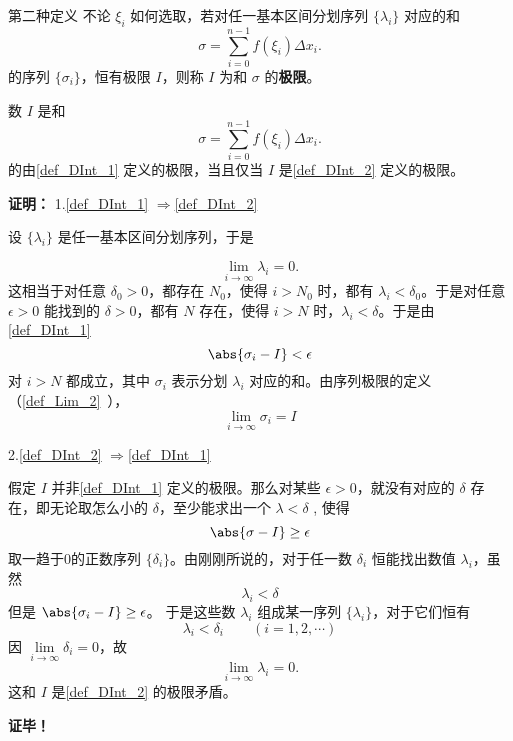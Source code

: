 \begin{definition}{第二种定义}
不论 $\xi_i$ 如何选取，若对任一基本区间分划序列 $\{\lambda_i\}$ 对应的和 
\begin{equation}
\sigma=\sum_{i=0}^{n-1}f(\xi_i)\Delta x_i.
\end{equation}
的序列 $\{\sigma_i\}$，恒有极限 $I$，则称 $I$ 为和 $\sigma$ 的\textbf{极限}。
\end{definition}
\begin{theorem}{}
数 $I$ 是和 
\begin{equation}
\sigma=\sum_{i=0}^{n-1}f(\xi_i)\Delta x_i.
\end{equation}
的由\autoref{def_DInt_1} 定义的极限，当且仅当 $I$ 是\autoref{def_DInt_2} 定义的极限。
\end{theorem}
\textbf{证明：}
1.\autoref{def_DInt_1} $\Rightarrow$\autoref{def_DInt_2} 

设 $\{\lambda_i\}$ 是任一基本区间分划序列，于是 

\begin{equation}
\lim\limits_{i\rightarrow\infty}\lambda_i=0.
\end{equation}
这相当于对任意 $\delta_0>0$，都存在 $N_0$，使得 $i>N_0$ 时，都有 $\lambda_i<\delta_0$。于是对任意 $\epsilon>0$ 能找到的 $\delta>0$，都有 $N$ 存在，使得 $i>N$ 时，$\lambda_i<\delta$。于是由\autoref{def_DInt_1} 
\begin{equation}
\abs{\sigma_i-I}<\epsilon
\end{equation}
对 $i>N$ 都成立，其中 $\sigma_i$ 表示分划 $\lambda_i$ 对应的和。由序列极限的定义（\autoref{def_Lim_2}~），
\begin{equation}
\lim_{i\rightarrow\infty} \sigma_i=I
\end{equation}

2.\autoref{def_DInt_2} $\Rightarrow$\autoref{def_DInt_1} 

假定 $I$ 并非\autoref{def_DInt_1} 定义的极限。那么对某些 $\epsilon>0$，就没有对应的 $\delta$ 存在，即无论取怎么小的 $\delta$，至少能求出一个 $\lambda<\delta$ , 使得
\begin{equation}
\abs{\sigma-I}\geq\epsilon
\end{equation}
取一趋于0的正数序列 $\{\delta_i\}$。由刚刚所说的，对于任一数 $\delta_i$ 恒能找出数值 $\lambda_i$，虽然
\begin{equation}
\lambda_i<\delta
\end{equation}
但是 $\abs{\sigma_i-I}\geq\epsilon$。
于是这些数 $\lambda_i$ 组成某一序列 $\{\lambda_i\}$，对于它们恒有
\begin{equation}
\lambda_i<\delta_i\qquad(i=1,2,\cdots)
\end{equation}
因 $\lim\limits_{i\rightarrow\infty}\delta_i=0$，故
\begin{equation}
\lim\limits_{i\rightarrow\infty}\lambda_i=0.
\end{equation}
这和 $I$ 是\autoref{def_DInt_2} 的极限矛盾。

\textbf{证毕！}
